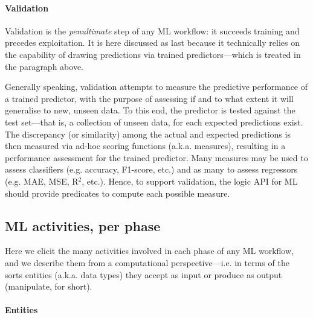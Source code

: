 \documentclass{article}
\begin{document}
\paragraph{Validation}
%
Validation is the \emph{penultimate} step of any ML workflow: it succeeds training and precedes exploitation.
%
It is here discussed as last because it technically relies on the capability of drawing predictions via trained predictors---which is treated in the paragraph above.

Generally speaking, validation attempts to measure the predictive performance of a trained predictor, with the purpose of assessing if and to what extent it will generalise to new, unseen data.
%
To this end, the predictor is tested against the test set---that is, a collection of unseen data, for each expected predictions exist.
%
The discrepancy (or similarity) among the actual and expected predictions is then measured via ad-hoc scoring functions (a.k.a. measures), resulting in a performance assessment for the trained predictor.
%
Many measures may be used to assess classifiers (e.g. accuracy, F1-score, etc.) and as many to assess regressors (e.g. MAE, MSE, R$^2$, etc.).
%
Hence, to support validation, the logic API for ML should provide predicates to compute each possible measure.

\subsection{ML activities, per phase}
\label{ssec:modelling}

Here we elicit the many activities involved in each phase of any ML workflow, and we describe them from a computational perspective---i.e. in terms of the sorts entities (a.k.a. data types) they accept as input or produce as output (manipulate, for short).

\paragraph{Entities}
\end{document}
